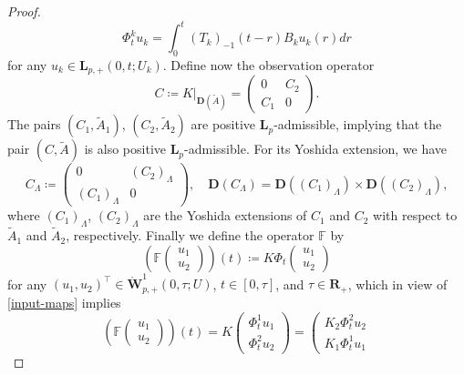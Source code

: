 \documentclass[a4paper,11pt,reqno]{amsart}
\def\t{\tau}
\def\R{\mathbf{R}}
\def\F{\mathbb F}
\theoremstyle{plain}
\numberwithin{equation}{section}
\begin{document}
\begin{proof}
\begin{equation*}
\Phi^k_{t}u_k= \int_{0}^{t} (T_k)_{-1}(t-r){B}_ku_k(r)dr
\end{equation*}
for any $u_k\in \bm{L}_{p,+}(0,t;U_k)$. Define now the observation operator 
\begin{equation*}
C\coloneqq K\vert_{ \bm{D}(\tilde{A})}=\left(\begin{matrix}
0 & C_2\\
C_1& 0
\end{matrix}\right).
\end{equation*}
The pairs $(C_1,\tilde{A}_1)$, $(C_2,\tilde{A}_2)$ are positive $\bm{L}_p$-admissible, implying that the pair $(C,\tilde{A})$ is also positive $\bm{L}_p$-admissible. For its Yoshida extension, we have
\begin{equation}\label{Yoshida-extension}
C_\Lambda\coloneqq\left(\begin{matrix}
0 & (C_2)_\Lambda\\
(C_1)_\Lambda& 0
\end{matrix}\right), \quad \bm{D}(C_\Lambda)=\bm{D}((C_1)_\Lambda)\times \bm{D}
((C_2)_\Lambda),
\end{equation}
where $(C_1)_\Lambda$, $(C_2)_\Lambda$ are the Yoshida extensions of $C_1$ and $C_2$ with respect to $\tilde{A}_1$ and $\tilde{A}_2$, respectively. Finally we define the operator $\F$ by
\begin{equation*}
\left(\F\left(\begin{matrix}
u_1\\
u_2
\end{matrix}\right)\right)(t)\coloneqq K \Phi_{t}\left(\begin{matrix}
u_1\\
u_2
\end{matrix}\right)
\end{equation*}
for any $(u_1,u_2)^\top\in \mathring{\bm{W}}^{1}_{p,+}(0,\t; U)$, $t\in[0,\t]$, and $\t\in\R_+$, which in view of \eqref{input-maps} implies
\begin{equation*}
\left(\F\left(\begin{matrix}
u_1\\
u_2
\end{matrix}\right)\right)(t)= K \left(\begin{matrix}
\Phi_{t}^1u_1\\
\Phi_{t}^2u_2
\end{matrix}\right)=\left(\begin{matrix}
K_2\Phi_{t}^2u_2\\
K_1\Phi_{t}^1u_1

\end{matrix}
\end{equation*}
\end{proof}
\end{document}
